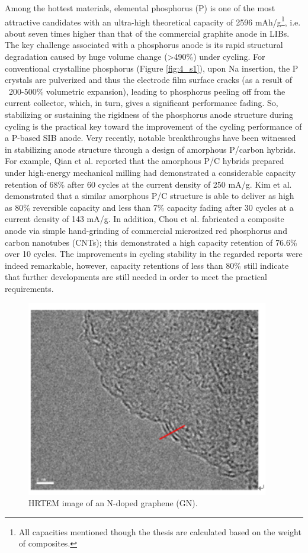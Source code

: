 Among the hottest materials, elemental phosphorus (P) is one of the most attractive candidates with an ultra-high theoretical capacity of 2596 mAh/g\footnote{All capacities mentioned though the thesis are calculated based on the weight of composites.},\cite{Qian2013b,Kim2013c,Li2013c} i.e. about seven times higher than that of the commercial graphite anode in LIBs. The key challenge associated with a phosphorus anode is its rapid structural degradation caused by huge volume change (>490\%) under cycling. For conventional crystalline phosphorus (Figure \ref{fig:4_s1}), upon Na insertion, the P crystals are pulverized and thus the electrode film surface cracks (as a result of ~200-500\% volumetric expansion), leading to phosphorus peeling off from the current collector, which, in turn, gives a significant performance fading. So, stabilizing or sustaining the rigidness of the phosphorus anode structure during cycling is the practical key toward the improvement of the cycling performance of a P-based SIB anode. Very recently, notable breakthroughs have been witnessed in stabilizing anode structure through a design of amorphous P/carbon hybrids.\cite{Qian2013b,Kim2013c,Li2013c} For example, Qian et al. reported that the amorphous P/C hybrids prepared under high-energy mechanical milling had demonstrated a considerable capacity retention of 68\% after 60 cycles at the current density of 250 mA/g.\cite{Qian2013b} Kim et al. demonstrated that a similar amorphous P/C structure is able to deliver as high as 80\% reversible capacity and less than 7\% capacity fading after 30 cycles at a current density of 143 mA/g.\cite{Kim2013c} In addition, Chou et al. fabricated a composite anode via simple hand-grinding of commercial microsized red phosphorus and carbon nanotubes (CNTs); this demonstrated a high capacity retention of 76.6\% over 10 cycles.\cite{Li2013c} The improvements in cycling stability in the regarded reports were indeed remarkable, however, capacity retentions of less than 80\% still indicate that further developments are still needed in order to meet the practical requirements.\cite{Luo2015b}\\

\begin{figure}  
\centering
\includegraphics[width=300pt]{figures/figure4_s2}
\caption[TEM of GN]
{HRTEM image of an N-doped graphene (GN).
\label{fig:4_s2}}
\end{figure}

